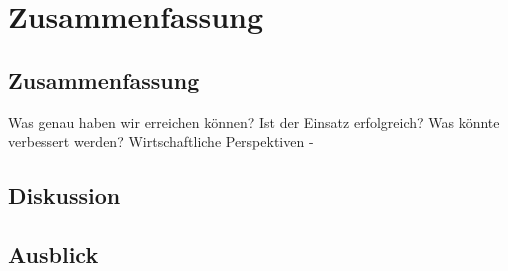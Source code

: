 \chapter{Zusammenfassung}


\section{Zusammenfassung}
Was genau haben wir erreichen können? Ist der Einsatz erfolgreich? Was könnte verbessert werden? Wirtschaftliche Perspektiven - 

\section{Diskussion}


\section{Ausblick}

